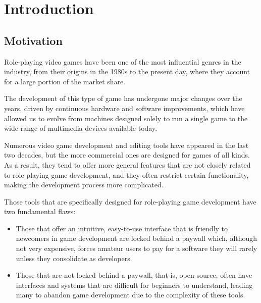\chapter*{Introduction}
\label{cap:introduction}



\section*{Motivation}
Role-playing video games have been one of the most influential genres in the industry, from their origins in the 1980s to the present day, where they account for a large portion of the market share.

\smallskip

The development of this type of game has undergone major changes over the years, driven by continuous hardware and software improvements, which have allowed us to evolve from machines designed solely to run a single game to the wide range of multimedia devices available today.

\medskip

Numerous video game development and editing tools have appeared in the last two decades, but the more commercial ones are designed for games of all kinds. As a result, they tend to offer more general features that are not closely related to role-playing game development, and they often restrict certain functionality, making the development process more complicated.

\smallskip

Those tools that are specifically designed for role-playing game development have two fundamental flaws:
\begin{itemize}
	\item Those that offer an intuitive, easy-to-use interface that is friendly to newcomers in game development are locked behind a paywall which, although not very expensive, forces amateur users to pay for a software they will rarely unless they consolidate as developers.
	\item Those that are not locked behind a paywall, that is, open source, often have interfaces and systems that are difficult for beginners to understand, leading many to abandon game development due to the complexity of these tools.
\end{itemize}

